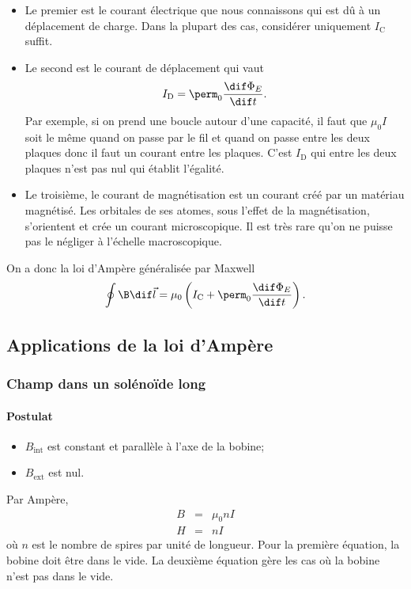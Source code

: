 \begin{itemize}
  \item Le premier est le courant électrique
    que nous connaissons qui est dû à un déplacement de charge.
    Dans la plupart des cas, considérer uniquement $I_\mathrm{C}$ suffit.
  \item Le second est le courant de déplacement qui vaut
    \[ I_\mathrm{D} = \perm_0\frac{\dif \Phi_E}{\dif t}. \]
    Par exemple, si on prend une boucle autour d'une capacité,
    il faut que $\mu_0I$ soit le même quand on passe par le fil et quand
    on passe entre les deux plaques donc il faut un courant entre les plaques.
    C'est $I_\mathrm{D}$ qui entre les deux plaques
    n'est pas nul qui établit l'égalité.
  \item Le troisième,
    le courant de magnétisation est un courant créé par un matériau magnétisé.
    Les orbitales de ses atomes, sous l'effet de la magnétisation,
    s'orientent et crée un courant microscopique.
    Il est très rare qu'on ne puisse pas le négliger à l'échelle macroscopique.
\end{itemize}
On a donc la loi d'Ampère généralisée par Maxwell
\[ \oint \B \dif \vec l =
\mu_0 \left(I_\mathrm{C} + \perm_0 \frac{\dif \Phi_E}{\dif t}\right). \]

\subsection{Applications de la loi d'Ampère}
\subsubsection{Champ dans un solénoïde long}
\label{sec:bbl}
\paragraph{Postulat}
\begin{itemize}
  \item $B_\mathrm{int}$ est constant et parallèle à l'axe de la bobine;
  \item $B_\mathrm{ext}$ est nul.
\end{itemize}
Par Ampère,
\begin{eqnarray*}
  B &=& \mu_0nI\\
  H &=& nI
\end{eqnarray*}
où $n$ est le nombre de spires par unité de longueur.
Pour la première équation, la bobine doit être dans le vide.
La deuxième équation gère les cas où la bobine n'est pas dans le vide.

